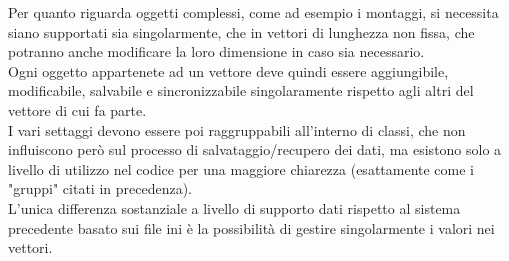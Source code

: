 \documentclass[\main/tesi.tex]{subfiles}
\begin{document}
Per quanto riguarda oggetti complessi, come ad esempio i montaggi, si necessita siano supportati sia singolarmente, che in vettori di lunghezza non fissa, che potranno anche modificare la loro dimensione in caso sia necessario.\\
Ogni oggetto appartenete ad un vettore deve quindi essere aggiungibile, modificabile, salvabile e sincronizzabile singolaramente rispetto agli altri del vettore di cui fa parte.\\
I vari settaggi devono essere poi raggruppabili all'interno di classi, che non influiscono però sul processo di salvataggio/recupero dei dati, ma esistono solo a livello di utilizzo nel codice per una maggiore chiarezza (esattamente come i "gruppi" citati in precedenza).\\
L'unica differenza sostanziale a livello di supporto dati rispetto al sistema precedente basato sui file ini è la possibilità di gestire singolarmente i valori nei vettori.
\end{document}
